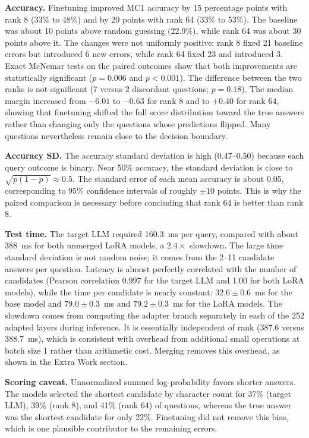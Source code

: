 \documentclass[11pt]{article}
\begin{document}
\textbf{Accuracy.} Finetuning improved MC1 accuracy by 15 percentage points with rank 8 (33\% to 48\%) and by 20 points with rank 64 (33\% to 53\%). The baseline was about 10 points above random guessing (22.9\%), while rank 64 was about 30 points above it. The changes were not uniformly positive: rank 8 fixed 21 baseline errors but introduced 6 new errors, while rank 64 fixed 23 and introduced 3. Exact McNemar tests on the paired outcomes show that both improvements are statistically significant ($p = 0.006$ and $p < 0.001$). The difference between the two ranks is not significant (7 versus 2 discordant questions; $p = 0.18$). The median margin increased from $-6.01$ to $-0.63$ for rank 8 and to $+0.40$ for rank 64, showing that finetuning shifted the full score distribution toward the true answers rather than changing only the questions whose predictions flipped. Many questions nevertheless remain close to the decision boundary.

\textbf{Accuracy SD.} The accuracy standard deviation is high (0.47--0.50) because each query outcome is binary. Near 50\% accuracy, the standard deviation is close to $\sqrt{p(1-p)} \approx 0.5$. The standard error of each mean accuracy is about 0.05, corresponding to 95\% confidence intervals of roughly $\pm 10$ points. This is why the paired comparison is necessary before concluding that rank 64 is better than rank 8.

\textbf{Test time.} The target LLM required 160.3~ms per query, compared with about 388~ms for both unmerged LoRA models, a $2.4\times$ slowdown. The large time standard deviation is not random noise; it comes from the 2--11 candidate answers per question. Latency is almost perfectly correlated with the number of candidates (Pearson correlation 0.997 for the target LLM and 1.00 for both LoRA models), while the time per candidate is nearly constant: $32.6 \pm 0.6$~ms for the base model and $79.0 \pm 0.3$~ms and $79.2 \pm 0.3$~ms for the LoRA models. The slowdown comes from computing the adapter branch separately in each of the 252 adapted layers during inference. It is essentially independent of rank (387.6 versus 388.7~ms), which is consistent with overhead from additional small operations at batch size 1 rather than arithmetic cost. Merging removes this overhead, as shown in the Extra Work section.

\textbf{Scoring caveat.} Unnormalized summed log-probability favors shorter answers. The models selected the shortest candidate by character count for 37\% (target LLM), 39\% (rank 8), and 41\% (rank 64) of questions, whereas the true answer was the shortest candidate for only 22\%. Finetuning did not remove this bias, which is one plausible contributor to the remaining errors.
\end{document}
